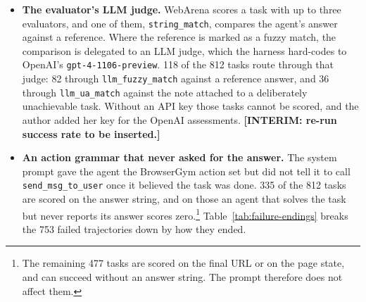 \begin{itemize}

\item \textbf{The evaluator's LLM judge.} WebArena scores a task with up to three evaluators, and one of them, \texttt{string\_match}, compares the agent's answer against a reference. Where the reference is marked as a fuzzy match, the comparison is delegated to an LLM judge, which the harness hard-codes to OpenAI's \texttt{gpt-4-1106-preview}. 118 of the 812 tasks route through that judge: 82 through \texttt{llm\_fuzzy\_match} against a reference answer, and 36 through \texttt{llm\_ua\_match} against the note attached to a deliberately unachievable task. Without an API key those tasks cannot be scored, and the author added her key for the OpenAI assessments.
\textbf{[INTERIM: re-run success rate to be inserted.]}

\item \textbf{An action grammar that never asked for the answer.} The system prompt gave the agent the BrowserGym action set but did not tell it to call \texttt{send\_msg\_to\_user} once it believed the task was done. 335 of the 812 tasks are scored on the answer string, and on those an agent that solves the task but never reports its answer scores zero.\footnote{The remaining 477 tasks are scored on the final URL or on the page state, and can succeed without an answer string. The prompt therefore does not affect them.} Table~\ref{tab:failure-endings} breaks the 753 failed trajectories down by how they ended.


\end{itemize}
